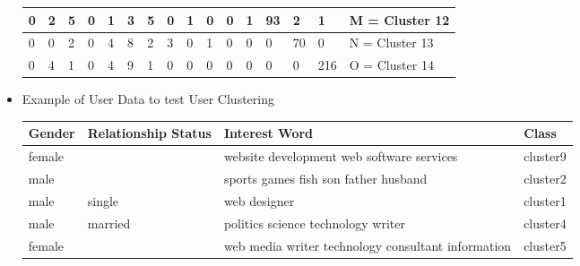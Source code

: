 \begin{itemize}
\begin{table}[H]
\begin{tabular}{|l|l|l|l|l|l|l|l|l|l|l|l|l|l|l|l|}
    0   & 2   & 5    & 0 & 1   & 3   & 5  & 0 & 1  & 0   & 0  & 1  & 93 & 2  & 1   & M = Cluster 12   \\ \hline
    0   & 0   & 2    & 0 & 4   & 8   & 2  & 3 & 0  & 1   & 0  & 0  & 0  & 70 & 0   & N = Cluster 13   \\ \hline
    0   & 4   & 1    & 0 & 4   & 9   & 1  & 0 & 0  & 0   & 0  & 0  & 0  & 0  & 216 & O = Cluster 14   \\ \hline
    \end{tabular}
\end{table}
\item Example of User Data to test User Clustering
\begin{table}[H]
    \begin{tabular}{|l|l|l|l|}
     \hline
    Gender & Relationship Status & Interest Word                                      & Class    \\  \hline
    female & ~                   & website development web  software services         & cluster9 \\  \hline
    male   & ~                   & sports games fish son father husband               & cluster2 \\  \hline
    male   & single              & web designer                                       & cluster1 \\  \hline
    male   & married             & politics science technology writer                 & cluster4 \\  \hline
    female & ~                   & web media writer technology consultant information & cluster5 \\  \hline
    \end{tabular}
\end{table}
\end{itemize} 